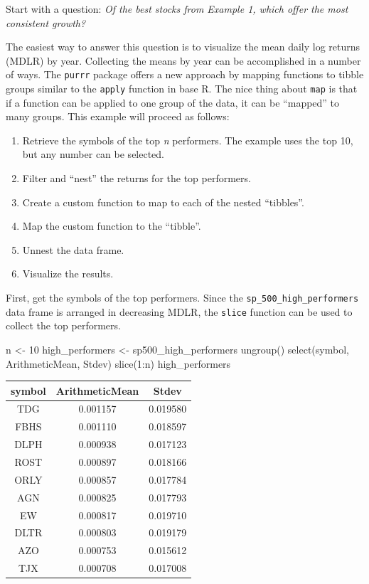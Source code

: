 Start with a question: \emph{Of the best stocks from Example 1, which
offer the most consistent growth?}

The easiest way to answer this question is to visualize the mean daily
log returns (MDLR) by year. Collecting the means by year can be
accomplished in a number of ways. The \texttt{purrr} package offers a
new approach by mapping functions to tibble groups similar to the
\texttt{apply} function in base R. The nice thing about \texttt{map} is
that if a function can be applied to one group of the data, it can be
``mapped'' to many groups. This example will proceed as follows:

\begin{enumerate}
\def\labelenumi{\arabic{enumi}.}
\tightlist
\item
  Retrieve the symbols of the top \emph{n} performers. The example uses
  the top 10, but any number can be selected.
\item
  Filter and ``nest'' the returns for the top performers.
\item
  Create a custom function to map to each of the nested ``tibbles''.
\item
  Map the custom function to the ``tibble''.
\item
  Unnest the data frame.
\item
  Visualize the results.
\end{enumerate}

First, get the symbols of the top performers. Since the
\texttt{sp\_500\_high\_performers} data frame is arranged in decreasing
MDLR, the \texttt{slice} function can be used to collect the top
performers.

\begin{Schunk}
\begin{Sinput}
n <- 10
high_performers <- sp500_high_performers %
    ungroup() %
    select(symbol, ArithmeticMean, Stdev) %
    slice(1:n)
high_performers
\end{Sinput}
\end{Schunk}

\begin{tabular}{ccc}
\toprule
symbol & ArithmeticMean & Stdev\\
\midrule
TDG & 0.001157 & 0.019580\\
FBHS & 0.001110 & 0.018597\\
DLPH & 0.000938 & 0.017123\\
ROST & 0.000897 & 0.018166\\
ORLY & 0.000857 & 0.017784\\
\addlinespace
AGN & 0.000825 & 0.017793\\
EW & 0.000817 & 0.019710\\
DLTR & 0.000803 & 0.019179\\
AZO & 0.000753 & 0.015612\\
TJX & 0.000708 & 0.017008\\
\bottomrule
\end{tabular}

